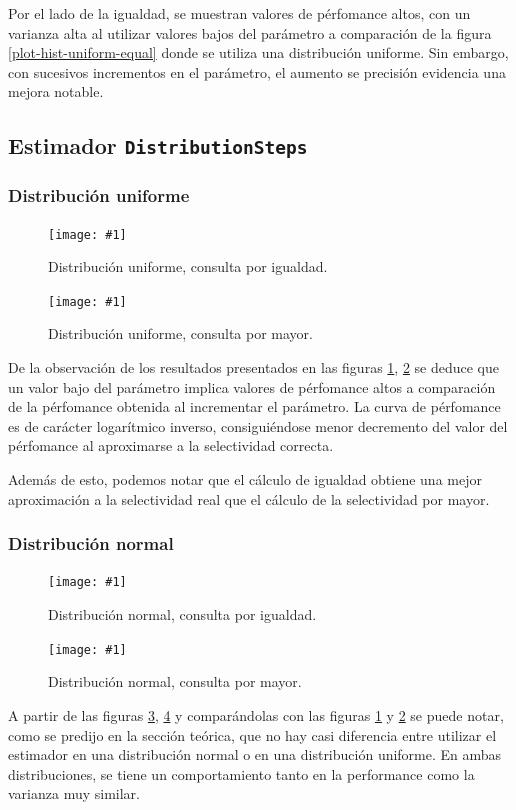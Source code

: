 \documentclass[a4paper, 10pt, twoside]{article}
\newcommand{\grafico}[3]{
  \begin{figure}[H]
    \texttt{[image: \#1]}
    \caption{#2}
    \label{#3}
  \end{figure}
}
\begin{document}
Por el lado de la igualdad, se muestran valores de pérfomance altos, con un varianza alta al utilizar valores bajos del parámetro a comparación de la figura \ref{plot-hist-uniform-equal} donde se utiliza una distribución uniforme. Sin embargo, con sucesivos incrementos en el parámetro, el aumento se precisión evidencia una mejora notable.   

\subsection{Estimador \texttt{DistributionSteps}}


\subsubsection{Distribución uniforme}
\grafico{plot-diststep-uniform-equal}
        {Distribución uniforme, consulta por igualdad.}
        {plot-diststep-uniform-equal}
\grafico{plot-diststep-uniform-greater}
        {Distribución uniforme, consulta por mayor.}
        {plot-diststep-uniform-greater}
De la observación de los resultados presentados en las figuras \ref{plot-diststep-uniform-equal}, \ref{plot-diststep-uniform-greater} se deduce que un valor bajo del parámetro implica valores de pérfomance altos a comparación de la pérfomance obtenida al 
incrementar el parámetro. La curva de pérfomance es de carácter logarítmico inverso, consiguiéndose menor decremento del valor del pérfomance al aproximarse a la selectividad correcta.

Además de esto, podemos notar que el cálculo de igualdad obtiene una mejor aproximación a la selectividad real que el cálculo de la selectividad por mayor.

\subsubsection{Distribución normal}    
\grafico{plot-diststep-normal-equal}
        {Distribución normal, consulta por igualdad.}
        {plot-diststep-normal-equal}
\grafico{plot-diststep-normal-greater}
        {Distribución normal, consulta por mayor.}
        {plot-diststep-normal-greater}

A partir de las figuras \ref{plot-diststep-normal-equal}, \ref{plot-diststep-normal-greater} y comparándolas con las figuras \ref{plot-diststep-uniform-equal} y \ref{plot-diststep-uniform-greater} se puede notar, como se predijo en la sección teórica, que no hay casi diferencia entre utilizar el estimador en una distribución normal o en una distribución uniforme. En ambas distribuciones, se tiene un comportamiento tanto en la performance como la varianza muy similar.
\end{document}
